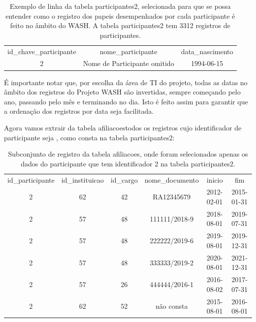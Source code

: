 \documentclass[
12pt,		%
openright,	%
twoside,  %
a4paper,			%
chapter=TITLE,		%
english,			%
french,				%
spanish,			%
brazil				%
]{USPSC-classe/USPSC}
\begin{document}
\begin{table}[htb]
\tiny
\caption{\label{2c8d9dda4031f0ea459292d025586b4d3e57ed84}Exemplo de linha da tabela participantes2, selecionada para que se possa entender como o registro dos papeis desempenhados por cada participante \'e feito no \^ambito do WASH. A tabela participantes2 tem 3312 registros de participantes.}

\centering
\begin{tabular}{|c|c|c|}
\hline
id\_chave\_participante  &  nome\_participante             &  data\_nascimento  \\
                     2  &  Nome de Participante omitido  &  1994-06-15 \\
\hline
\end{tabular}
\end{table}


\'E importante notar que, por escolha da \'area de TI do projeto, todas as datas no \^ambito dos registros do Projeto WASH s\~ao invertidas, sempre come\c{c}ando pelo ano, passando pelo m\^es e terminando no dia. Isto \'e feito assim para garantir que a ordena\c{c}\~ao dos registros por data seja facilitada.


Agora vamos extrair da tabela \textquotedbl afiliacoes\textquotedbl  todos os registros cujo identificador de participante seja \textquotedbl , como consta na tabela participantes2:






\begin{table}[htb]
\tiny
\caption{\label{e6120545268b93238330297571c4756e7c97df1a}Subconjunto de registro da tabela afiliacoes, onde foram selecionados apenas os dados do participante que tem identificador 2 na tabela participantes2.}

\centering
\begin{tabular}{|c|c|c|c|c|c|}
\hline
id\_participante  &  id\_instituicao  &  id\_cargo  &  nome\_documento  &  inicio      &  fim \\
              2  &              62  &        42  &  RA12345679      &  2012-02-01  &  2015-01-31  \\
              2  &              57  &        48  &  111111/2018-9   &  2018-08-01  &  2019-07-31  \\
              2  &              57  &        48  &  222222/2019-6   &  2019-08-01  &  2019-12-31  \\
              2  &              57  &        48  &  333333/2019-2   &  2020-08-01  &  2021-12-31  \\
              2  &              57  &        26  &  444444/2016-1   &  2016-08-02  &  2017-07-31  \\
              2  &              62  &        52  &  n\~ao consta      &  2015-08-01  &  2016-08-01 \\
\hline
\end{tabular}
\end{table}
\end{document}

